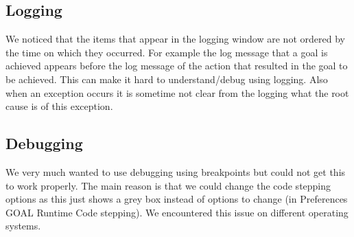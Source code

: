 \documentclass[a4paper,11pt]{article}
\begin{document}
\subsection{Logging}
We noticed that the items that appear in the logging window are not ordered by the time on which they occurred. For example the log message that a goal is achieved appears before the log message of the action that resulted in the goal to be achieved. This can make it hard to understand/debug using logging. Also when an exception occurs it is sometime not clear from the logging what the root cause is of this exception.

\subsection{Debugging}
We very much wanted to use debugging using breakpoints but could not get this to work properly. The main reason is that we could change the code stepping options as this just shows a grey box instead of options to change (in Preferences \textrightarrow GOAL \textrightarrow Runtime \textrightarrow Code stepping). We encountered this issue on different operating systems. 
\end{document}
